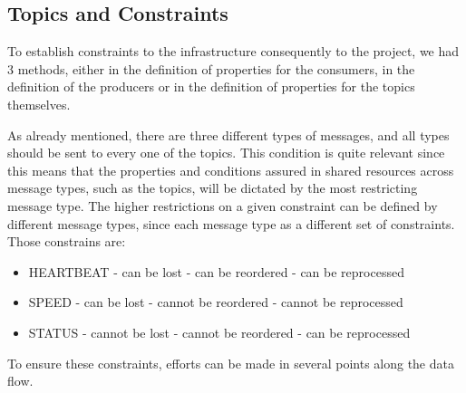 \documentclass[12pt]{article}
\begin{document}
\subsection{Topics and Constraints} \label{topics} %
To establish constraints to the infrastructure consequently to the project, we had 3 methods, either in the definition of properties for the consumers, in the definition of the producers or in the definition of properties for the topics themselves.

As already mentioned, there are three different types of messages, and all types should be sent to every one of the topics. This condition is quite relevant since this means that the properties and conditions assured in shared resources across message types, such as the topics, will be dictated by the most restricting message type. The higher restrictions on a given constraint can be defined by different message types, since each message type as a different set of constraints. Those constrains are:

\begin{multicols}{3}
  \begin{itemize}
    \item HEARTBEAT
    \newline - can be lost
    \newline - can be reordered
    \newline - can be reprocessed
  \end{itemize}

  \columnbreak

  \begin{itemize}
    \item SPEED
    \newline - can be lost
    \newline - cannot be reordered
    \newline - cannot be reprocessed
  \end{itemize}

  \columnbreak

  \begin{itemize}
    \item STATUS
    \newline - cannot be lost
    \newline - cannot be reordered
    \newline - can be reprocessed
  \end{itemize}
\end{multicols}

To ensure these constraints, efforts can be made in several points along the data flow.
\end{document}
